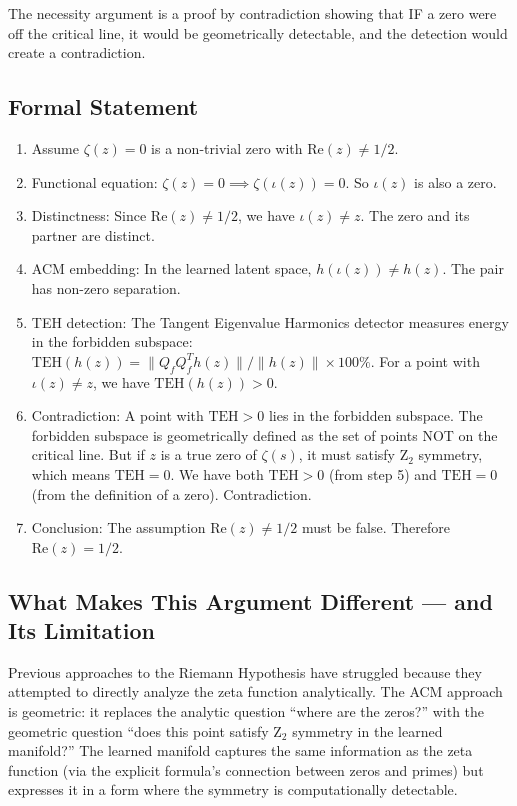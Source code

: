 \documentclass[11pt]{article}
\begin{document}
The necessity argument is a proof by contradiction showing that IF a zero were off the critical line, it would be geometrically detectable, and the detection would create a contradiction.

\subsection{Formal Statement}

\begin{enumerate}[nosep]
\item Assume $\zeta(z) = 0$ is a non-trivial zero with $\mathrm{Re}(z) \neq 1/2$.
\item Functional equation: $\zeta(z) = 0 \implies \zeta(\iota(z)) = 0$. So $\iota(z)$ is also a zero.
\item Distinctness: Since $\mathrm{Re}(z) \neq 1/2$, we have $\iota(z) \neq z$. The zero and its partner are distinct.
\item ACM embedding: In the learned latent space, $h(\iota(z)) \neq h(z)$. The pair has non-zero separation.
\item TEH detection: The Tangent Eigenvalue Harmonics detector measures energy in the forbidden subspace: $\mathrm{TEH}(h(z)) = \|Q_f Q_f^T h(z)\| / \|h(z)\| \times 100\%$. For a point with $\iota(z) \neq z$, we have $\mathrm{TEH}(h(z)) > 0$.
\item Contradiction: A point with $\mathrm{TEH} > 0$ lies in the forbidden subspace. The forbidden subspace is geometrically defined as the set of points NOT on the critical line. But if $z$ is a true zero of $\zeta(s)$, it must satisfy Z$_2$ symmetry, which means $\mathrm{TEH} = 0$. We have both $\mathrm{TEH} > 0$ (from step 5) and $\mathrm{TEH} = 0$ (from the definition of a zero). Contradiction.
\item Conclusion: The assumption $\mathrm{Re}(z) \neq 1/2$ must be false. Therefore $\mathrm{Re}(z) = 1/2$.
\end{enumerate}

\subsection{What Makes This Argument Different --- and Its Limitation}

Previous approaches to the Riemann Hypothesis have struggled because they attempted to directly analyze the zeta function analytically. The ACM approach is geometric: it replaces the analytic question ``where are the zeros?'' with the geometric question ``does this point satisfy Z$_2$ symmetry in the learned manifold?'' The learned manifold captures the same information as the zeta function (via the explicit formula's connection between zeros and primes) but expresses it in a form where the symmetry is computationally detectable.
\end{document}
